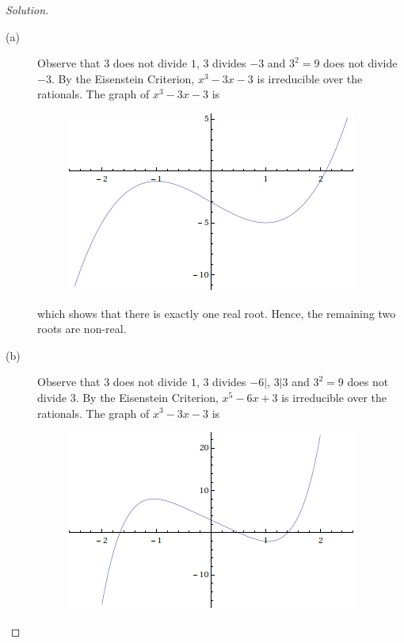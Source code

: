 \documentclass[12pt,leqno]{article}
\numberwithin{equation}{section}
\theoremstyle{definition}
\begin{document}
\pagebreak\begin{proof}[Solution]
 \begin{description}
  \item [(a)] Observe that $3$ does not divide $1$, $3$ divides $-3$ and $3^2=9$ does not divide $-3$. By the Eisenstein Criterion, $x^3-3x-3$ is irreducible over the rationals. The graph of $x^3-3x-3$ is 
\begin{figure}[h]
\centering\includegraphics[scale=.5]{5-5-a.png}                                                                                                                                                                                                                                                                                                                                                               \end{figure}

which shows that there is exactly one real root. Hence, the remaining two roots are non-real. 
  \item [(b)] Observe that $3$ does not divide $1$, $3$ divides $-6|$, $3|3$ and $3^2=9$ does not divide $3$. By the Eisenstein Criterion, $x^5-6x+3$ is irreducible over the rationals. The graph of $x^3-3x-3$ is
\begin{figure}[h]
\centering\includegraphics[scale=.5]{5-5-b.png}                                                                                                                                                                                                                                                                                                                                                               \end{figure} 


\end{description}
\end{proof}
\end{document}
